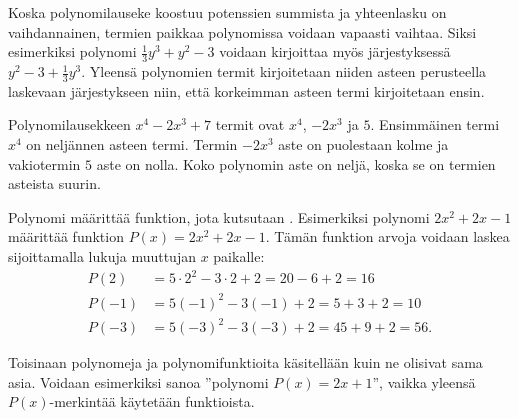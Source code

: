 Koska polynomilauseke koostuu potenssien summista ja yhteenlasku on vaihdannainen, termien paikkaa polynomissa voidaan vapaasti vaihtaa. Siksi esimerkiksi polynomi $\frac{1}{3}y^3+y^2-3$ voidaan kirjoittaa myös järjestyksessä $y^2-3+\frac{1}{3}y^3$. Yleensä polynomien termit kirjoitetaan niiden asteen perusteella laskevaan järjestykseen niin, että korkeimman asteen termi kirjoitetaan ensin.

\begin{esimerkki}
Polynomilausekkeen $x^4-2x^3+7$ termit ovat $x^4$, $-2x^3$ ja $5$.
Ensimmäinen termi $x^4$ on neljännen asteen termi. Termin $-2x^3$ aste on puolestaan kolme ja vakiotermin $5$ aste on nolla.
Koko polynomin aste on neljä, koska se on termien asteista suurin.
\end{esimerkki}



Polynomi määrittää funktion, jota kutsutaan . Esimerkiksi polynomi $2x^2+2x-1$ määrittää funktion $P(x)=2x^2+2x-1$. Tämän funktion arvoja voidaan laskea sijoittamalla lukuja muuttujan $x$ paikalle:
\begin{align*}
P(2) & = 5\cdot 2^2-3\cdot 2+2 = 20 - 6 + 2 = 16 \\
P(-1) & = 5(-1)^2-3(-1)+2 = 5 + 3 + 2 = 10 \\
P(-3) & = 5(-3)^2-3(-3)+2 = 45 + 9 + 2 = 56.
\end{align*}

Toisinaan polynomeja ja polynomifunktioita käsitellään kuin ne olisivat sama asia.
Voidaan esimerkiksi sanoa ''polynomi $P(x)=2x+1$'', vaikka yleensä $P(x)$-merkintää käytetään funktioista.


